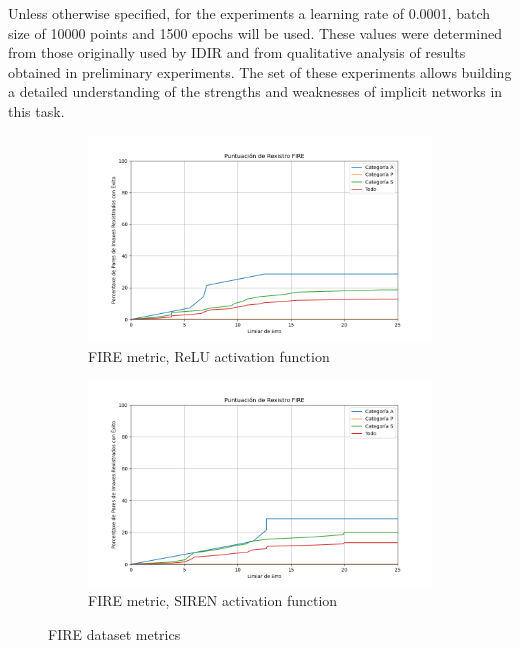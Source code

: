 Unless otherwise specified, for the experiments a learning rate of 0.0001, batch size of 10000 points and 1500 epochs will be used. These values were determined from those originally used by IDIR and from qualitative analysis of results obtained in preliminary experiments. The set of these experiments allows building a detailed understanding of the strengths and weaknesses of implicit networks in this task.

\begin{figure}[tbp]
    \centering
    \begin{subfigure}[b]{0.5\textwidth}
        \centering
        \includegraphics[width=\textwidth]{imaxes/FIRE_scores/fire_registration_score_ReLU.png}
        \caption{FIRE metric, ReLU activation function}
        \label{fig:FIRE_relu}
    \end{subfigure}\hfill
    \begin{subfigure}[b]{0.5\textwidth}
        \centering
        \includegraphics[width=\textwidth]{imaxes/FIRE_scores/fire_registration_scores_SIREN.png}
        \caption{FIRE metric, SIREN activation function}
        \label{fig:FIRE_SIREN}
    \end{subfigure}
    \caption{FIRE dataset metrics}
    \label{fig:FIRE_scores}
\end{figure}

